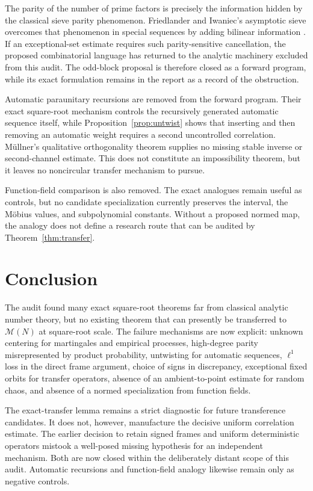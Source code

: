 \documentclass[11pt]{amsart}
\numberwithin{equation}{section}
\theoremstyle{plain}
\theoremstyle{definition}
\theoremstyle{remark}
\newcommand{\Mertens}{\mathcal M}
\begin{document}
The parity of the number of prime factors is precisely the information hidden
by the classical sieve parity phenomenon.  Friedlander and Iwaniec's
asymptotic sieve overcomes that phenomenon in special sequences by adding
bilinear information \cite{FriedlanderIwaniec1998}.  If an exceptional-set
estimate requires such parity-sensitive cancellation, the proposed
combinatorial language has returned to the analytic machinery excluded from
this audit.  The odd-block proposal is therefore closed as a forward program,
while its exact formulation remains in the report as a record of the
obstruction.

Automatic paraunitary recursions are removed from the forward program.  Their
exact square-root mechanism controls the recursively generated automatic
sequence itself, while Proposition~\ref{prop:untwist} shows that inserting and
then removing an automatic weight requires a second uncontrolled correlation.
M\"ullner's qualitative orthogonality theorem supplies no missing stable
inverse or second-channel estimate.  This does not constitute an impossibility
theorem, but it leaves no noncircular transfer mechanism to pursue.

Function-field comparison is also removed.  The exact analogues remain useful
as controls, but no candidate specialization currently preserves the interval,
the M\"obius values, and subpolynomial constants.  Without a proposed normed
map, the analogy does not define a research route that can be audited by
Theorem~\ref{thm:transfer}.

\section{Conclusion}\label{sec:conclusion}

The audit found many exact square-root theorems far from classical analytic
number theory, but no existing theorem that can presently be transferred to
\(\Mertens(N)\) at square-root scale.  The failure mechanisms are now explicit:
unknown centering for martingales and empirical processes, high-degree parity
misrepresented by product probability, untwisting for automatic sequences,
\(\ell^1\) loss in the direct frame argument, choice of signs in discrepancy,
exceptional fixed orbits for transfer operators, absence of an ambient-to-point
estimate for random chaos, and absence of a normed specialization from function
fields.

The exact-transfer lemma remains a strict diagnostic for future transference
candidates.  It does not, however, manufacture the decisive uniform
correlation estimate.  The earlier decision to retain signed frames and
uniform deterministic operators mistook a well-posed missing hypothesis for an
independent mechanism.  Both are now closed within the deliberately distant
scope of this audit.  Automatic recursions and function-field analogy likewise
remain only as negative controls.
\end{document}
